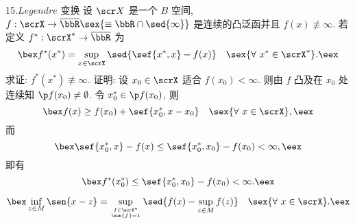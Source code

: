 15.$Legendre$ 变换
 设 $\scr X$ 是一个 $B$ 空间, $f:\scrX\to \overline{\bbR}\sex{\equiv \bbR\cap\sed{\infty}}$ 是连续的凸泛函并且 $f(x)\not\equiv \infty$. 若定义 $f^*:\scrX^*\to \overline{\bbR}$ 为 $$\bex f^*(x^*)=\sup_{x\in\scrX}\sed{\sef{x^*,x}-f(x)}\quad\sex{\forall\ x^*\in \scrX^*}. \eex$$ 求证: $f^*(x^*)\not\equiv \infty$.
证明: 设 $x_0\in \scrX$ 适合 $f(x_0)<\infty$. 则由 $f$ 凸及在 $x_0$ 处连续知 $\p f(x_0)\neq \emptyset$. 令 $x_0^*\in \p f(x_0)$, 则 $$\bex f(x)\geq f(x_0)+\sef{x_0^*,x-x_0}\quad\sex{\forall\ x\in\scrX}, \eex$$ 而 $$\bex \sef{x_0^*,x}-f(x) \leq \sef{x_0^*,x_0}-f(x_0)<\infty, \eex$$ 即有 $$\bex f^*(x_0^*)\leq\sef{x_0^*,x_0}-f(x_0)<\infty. \eex$$

$$\bex \inf_{z\in M}\sen{x-z} =\sup_{f\in \scrX^*\atop \sen{f}=1} \sed{f(x)-\sup_{z\in M}f(z)}\quad\sex{\forall\ x\in \scrX}. \eex$$